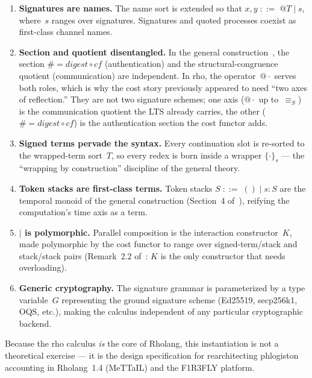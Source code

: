 \documentclass[11pt,a4paper]{article}
\makeatletter
\newcommand{\Par}{\mathbin{|}}
\newcommand{\quot}[1]{@#1}
\newcommand{\signed}[2]{\{#1\}_{#2}}
\newcommand{\hashf}{\texttt{\#}}
\newcommand{\Seq}{\equiv_{\!S}}
\makeatother
\begin{document}
\begin{enumerate}[label=(\roman*)]
  \item \textbf{Signatures are names.}  The name sort is
    extended so that $x, y \;::=\; \quot{T} \mid s$, where~$s$
    ranges over signatures.  Signatures and quoted processes
    coexist as first-class channel names.
  \item \textbf{Section and quotient disentangled.}  In the
    general construction~\cite{CostEndofunctor}, the section
    $\hashf = \mathit{digest} \circ \mathit{cf}$ (authentication)
    and the structural-congruence quotient (communication) are
    independent.  In rho, the operator~$\quot{\cdot}$ serves
    both roles, which is why the cost story previously appeared
    to need ``two axes of reflection.''  They are not two
    signature schemes; one axis ($\quot{\cdot}$ up to~$\Seq$)
    is the communication quotient the LTS already carries, the
    other ($\hashf = \mathit{digest} \circ \mathit{cf}$) is the
    authentication section the cost functor adds.
  \item \textbf{Signed terms pervade the syntax.}  Every
    continuation slot is re-sorted to the wrapped-term sort~$T$,
    so every redex is born inside a wrapper $\signed{\cdot}{s}$
    --- the ``wrapping by construction'' discipline of the
    general theory.
  \item \textbf{Token stacks are first-class terms.}  Token
    stacks $S \;::=\; () \mid s : S$ are the temporal
    monoid of the general construction (Section~4
    of~\cite{CostEndofunctor}), reifying the computation's time
    axis as a term.
  \item \textbf{$\Par$ is polymorphic.}  Parallel composition
    is the interaction constructor~$K$, made polymorphic by
    the cost functor to range over signed-term/stack and
    stack/stack pairs (Remark~2.2 of~\cite{CostEndofunctor}:
    $K$ is the only constructor that needs overloading).
  \item \textbf{Generic cryptography.}  The signature grammar
    is parameterized by a type variable~$G$ representing the
    ground signature scheme (Ed25519, secp256k1, OQS, etc.),
    making the calculus independent of any particular
    cryptographic backend.
\end{enumerate}

\noindent
Because the rho calculus \emph{is} the core of Rholang, this
instantiation is not a theoretical exercise --- it is the
design specification for rearchitecting phlogiston accounting in
Rholang~1.4 (MeTTaIL) and the F1R3FLY platform.
\end{document}

